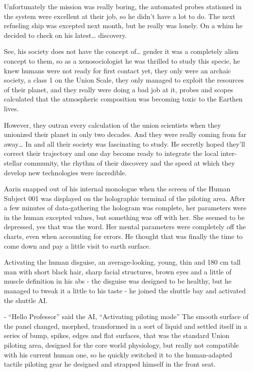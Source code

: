 \documentclass[hidelinks,12pt,a4paper]{book}
\begin{document}
Unfortunately the mission was really boring, the automated probes stationed in the system were 
excellent at their job, so he didn't have a lot to do. The next refueling ship was excepted next 
month, but he really was lonely. On a whim he decided to check on his latest… discovery.\par
\bigskip

See, his society does not have the concept of… gender it was a completely alien concept to them, so as a 
xenosociologist he was thrilled to study this specie, he knew humans were not ready for first contact yet, 
they only were an archaic society, a class 1 on the Union Scale, they only managed to exploit the resources of their 
planet, and they really were doing a bad job at it, probes and scopes calculated that the atmospheric composition was 
becoming toxic to the Earthen lives.\par
\bigskip

However, they outran every calculation of the union scientists when they unionized their planet in only two decades. 
And they were really coming from far away… In and all their society was fascinating to study. 
He secretly hoped they'll correct their trajectory and one day become ready to integrate the local inter-stellar community, 
the rhythm of their discovery and the speed at which they develop new technologies were incredible.\par
\bigskip

Aarin snapped out of his internal monologue when the screen of the Human Subject 001 was displayed on the holographic terminal of the piloting area.
After a few minutes of data-gathering the hologram was complete, her parameters were in the human excepted values, 
but something was off with her. She seemed to be depressed, yes that was the word. Her mental parameters were completely 
off the charts, even when accounting for errors. He thought that was finally the time to come down and pay a little visit 
to earth surface.\par
\bigskip

Activating the human \gls{disguise}, an average-looking, young, thin and 180 cm tall man with short black hair, 
sharp facial structures, brown eyes and a little of muscle definition in his abs - the disguise was designed to be healthy, but he managed to tweak it a little to his taste -
 he joined the shuttle bay and activated the shuttle AI.\par
 \bigskip

- “Hello Professor” said the AI, “Activating piloting mode”\newline
The smooth surface of the panel changed, morphed, transformed in a sort of liquid and settled itself 
in a series of bump, spikes, edges and flat surfaces, that was the standard Union piloting area, 
designed for the core world physiology, but really not compatible with his current human one, so he 
quickly switched it to the human-adapted tactile piloting gear he designed and strapped himself in the front seat.\par
\bigskip
\end{document}
